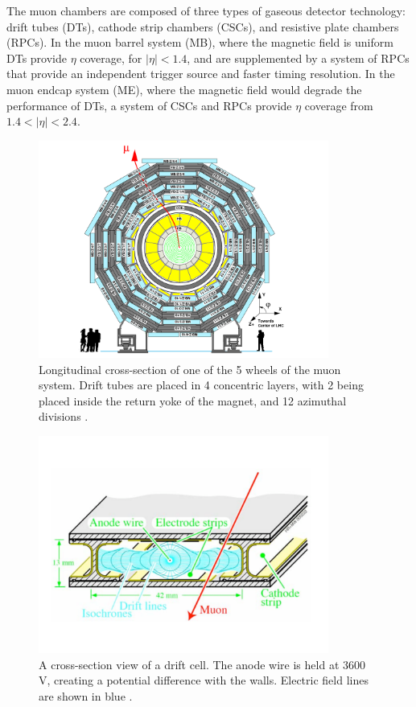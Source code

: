 \par The muon chambers are composed of three types of gaseous detector
technology: drift tubes (DTs), cathode strip chambers (CSCs), and
resistive plate chambers (RPCs).  In the muon barrel system (MB),
where the magnetic field is uniform DTs provide $\eta$ coverage, for
$|\eta|<1.4$, and are supplemented by a system of RPCs that provide an
independent trigger source and faster timing resolution.  In the muon
endcap system (ME), where the magnetic field would degrade the
performance of DTs, a system of CSCs and RPCs provide $\eta$ coverage
from $1.4<|\eta|<2.4$.  

\begin{figure}[h]
   \centering
  \includegraphics[width=0.85\textwidth]{Figures/CMS_Diagrams/Muon__DT_layout.pdf}
  \caption{Longitudinal cross-section of one of the 5 wheels of the
    muon system.  Drift tubes are placed in 4 concentric layers, with
    2 being placed inside the return yoke of the magnet, and 12
    azimuthal divisions \cite{CMS:CMS_Machine_Chatrchyan:2008aa}.} \label{fig:muon_dt_layout}
\end{figure}

\begin{figure}[h]
   \centering
  \includegraphics[width=0.85\textwidth]{Figures/CMS_Diagrams/Muon__DT_cell.pdf}
  \caption{A cross-section view of a drift cell.  The anode wire is
    held at 3600 V, creating a potential difference with the walls.
    Electric field lines are shown in blue \cite{CMS:CMS_Machine_Chatrchyan:2008aa}.} \label{fig:muon_dt_cell}
\end{figure}

